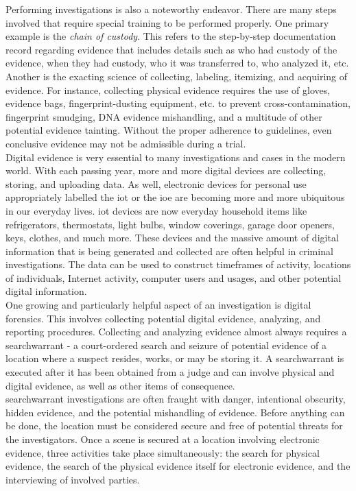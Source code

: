 \documentclass[12pt]{article}
\begin{document}
Performing investigations is also a noteworthy endeavor.  There are many steps involved that require special
training to be performed properly.  One primary example is the {\em chain of custody}.  This refers to the 
step-by-step documentation record regarding evidence that includes details such as who had custody of
the evidence, when they had custody, who it was transferred to, who analyzed it, etc. Another is the exacting
science of collecting, labeling, itemizing, and acquiring of evidence.
For instance, collecting physical evidence requires the use of gloves,
evidence bags, fingerprint-dusting equipment, etc. to prevent
cross-contamination, fingerprint smudging, DNA evidence mishandling,
and a multitude of other potential evidence tainting.  Without the
proper adherence to  guidelines, even conclusive evidence may not be
admissible during a trial.\\

Digital evidence is very essential to many investigations and cases in the modern world.
With each passing year, more and more digital devices are collecting, storing, and uploading data.  As
well, electronic devices for personal use appropriately labelled the \gls{iot} or
the \gls{ioe} are becoming more and more
ubiquitous in our everyday lives.  \gls{iot} devices are now everyday household items like refrigerators,
thermostats, light bulbs, window coverings, garage door openers, keys, clothes, and much more.
These devices and the massive amount of digital information that
is being generated and collected are often helpful in criminal investigations.  The data can be used to
construct timeframes of activity, locations of individuals, Internet activity, computer users and usages,
and other potential digital information.\\

One growing and particularly helpful aspect of an investigation is digital forensics.
This involves collecting potential digital evidence, analyzing, and reporting procedures.
Collecting and analyzing evidence almost always requires a \gls{searchwarrant} - a court-ordered search and
seizure of potential evidence of a location where a suspect resides, works, or may be storing it.
A \gls{searchwarrant} is executed after it has been obtained from a judge and can involve physical and
digital evidence, as well as other items of consequence.\\

\Gls{searchwarrant} investigations are often fraught with danger, intentional obscurity, hidden evidence, and
the potential mishandling of evidence.  Before anything can be done, the location must be considered
secure and free of potential threats for the investigators.  Once a scene is
secured at a location involving electronic evidence, three activities
take place simultaneously: the search for physical evidence, the search of the physical evidence
itself for electronic evidence, and the interviewing of involved parties.\\
\end{document}
